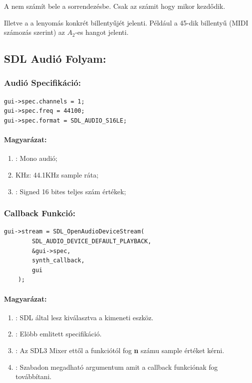 \documentclass{article}
\begin{document}
\begin{cnote}[Megjegyzés:]
    A  nem számít bele a sorrendezésbe.
    Csak az számit hogy mikor kezdődik.

    Illetve a  a lenyomás konkrét billentyűjét jelenti.
    Például a 45-dik billentyű (MIDI számozás szerint) az \(A_2\)-es hangot 
    jelenti.
\end{cnote}

\subsection{SDL Audió Folyam:}

\subsubsection{Audió Specifikáció:}
\begin{lstlisting}[caption={Audió specifikáció}]
gui->spec.channels = 1;
gui->spec.freq = 44100;
gui->spec.format = SDL_AUDIO_S16LE;
\end{lstlisting}

\paragraph{Magyarázat:}
\begin{enumerate}
    \item {}: Mono audió;
    \item {}KHz: 44.1KHz sample ráta;
    \item {}: Signed 16 bites teljes 
        szám értékek;
\end{enumerate}

\subsubsection{Callback Funkció:}
\begin{lstlisting}[caption={Audió folyam megnyitása}]
    gui->stream = SDL_OpenAudioDeviceStream(
        SDL_AUDIO_DEVICE_DEFAULT_PLAYBACK,
        &gui->spec,
        synth_callback,
        gui
    );
\end{lstlisting}

\paragraph{Magyarázat:}
\begin{enumerate}
    \item {}: 
        SDL által lesz kiválasztva a kimeneti eszköz.
    \item {}: Elöbb emlitett specifikáció.
    \item {}: Az SDL3 Mixer ettől a funkciótól 
        fog \textbf{n} számu sample értéket kérni.
    \item {}: Szabadon megadható argumentum amit a callback 
        funkciónak fog továbbítani.
\end{enumerate}
\end{document}
